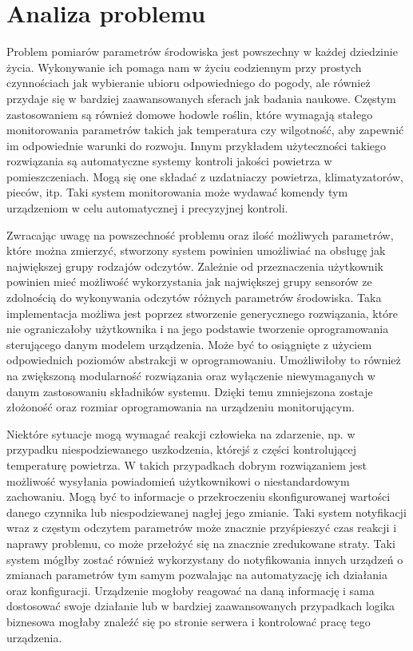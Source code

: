 \chapter{Analiza problemu}

Problem pomiarów parametrów środowiska jest powszechny w każdej dziedzinie życia.
Wykonywanie ich pomaga nam w życiu codziennym przy prostych czynnościach jak
wybieranie ubioru odpowiedniego do pogody, ale również przydaje się w bardziej
zaawansowanych sferach jak badania naukowe. Częstym zastosowaniem są również
domowe hodowle roślin, które wymagają stałego monitorowania parametrów
takich jak temperatura czy wilgotność, aby zapewnić im odpowiednie warunki
do rozwoju. Innym przykładem użyteczności takiego rozwiązania są automatyczne
systemy kontroli jakości powietrza w pomieszczeniach. Mogą się one składać
z uzdatniaczy powietrza, klimatyzatorów, pieców, itp. Taki system monitorowania
może wydawać komendy tym urządzeniom w celu automatycznej i precyzyjnej kontroli.


Zwracając uwagę na powszechność problemu oraz ilość możliwych parametrów,
które można zmierzyć, stworzony system powinien umożliwiać na obsługę jak 
największej grupy rodzajów odczytów. Zależnie od przeznaczenia użytkownik
powinien mieć możliwość wykorzystania jak największej grupy sensorów ze
zdolnością do wykonywania odczytów różnych parametrów środowiska.
Taka implementacja możliwa jest poprzez stworzenie generycznego rozwiązania, które
nie ograniczałoby użytkownika i na jego podstawie tworzenie oprogramowania
sterującego danym modelem urządzenia.
Może być to osiągnięte z użyciem odpowiednich poziomów abstrakcji w oprogramowaniu.
Umożliwiłoby to również na zwiększoną modularność rozwiązania oraz
wyłączenie niewymaganych w danym zastosowaniu składników systemu.
Dzięki temu zmniejszona zostaje złożoność oraz rozmiar oprogramowania
na urządzeniu monitorującym.


Niektóre sytuacje mogą wymagać reakcji człowieka na zdarzenie, np.
w przypadku niespodziewanego uszkodzenia, którejś z części kontrolującej
temperaturę powietrza. W takich przypadkach dobrym rozwiązaniem jest możliwość
wysyłania powiadomień użytkownikowi o niestandardowym zachowaniu.
Mogą być to informacje o przekroczeniu skonfigurowanej wartości danego czynnika
lub niespodziewanej nagłej jego zmianie. Taki system notyfikacji wraz z
częstym odczytem parametrów może znacznie przyśpieszyć czas reakcji
i naprawy problemu, co może przełożyć się na znacznie zredukowane straty.
Taki system mógłby zostać również wykorzystany do notyfikowania innych
urządzeń o zmianach parametrów tym samym pozwalając na automatyzację
ich działania oraz konfiguracji. Urządzenie mogłoby reagować na daną 
informację i sama dostosować swoje działanie lub w bardziej zaawansowanych
przypadkach logika biznesowa mogłaby znaleźć się po stronie serwera i 
kontrolować pracę tego urządzenia.


